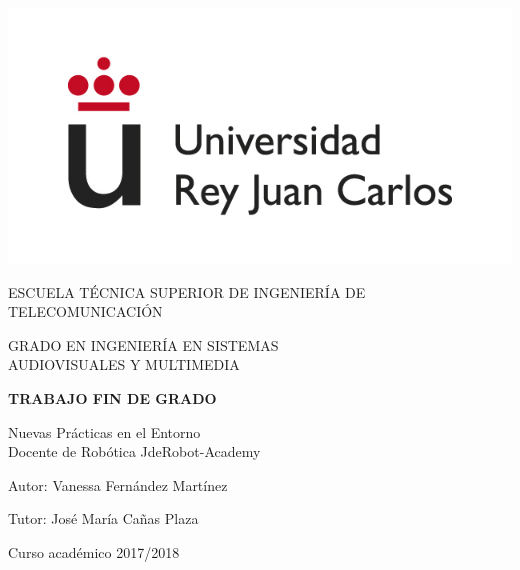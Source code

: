 \begin{titlepage}
	\begin{center}
		\vspace*{3mm}
		\begin{center}
			\includegraphics[width=0.4\linewidth]{figures/logo.jpg}
		\end{center}
		\vspace{6.5mm}
		
		\fontsize{15.5}{14}\selectfont ESCUELA TÉCNICA SUPERIOR DE INGENIERÍA DE TELECOMUNICACIÓN
		\vspace{13mm}
		
		\fontsize{14}{14}\selectfont GRADO EN INGENIERÍA EN SISTEMAS \\ AUDIOVISUALES Y MULTIMEDIA
		
		\vspace{70pt}
		
		\fontsize{15.7}{14}\selectfont \textbf{TRABAJO FIN DE GRADO} 
		
		\vspace{25mm}
		\begin{huge}
			Nuevas Prácticas en el Entorno \\ \vspace{0.4cm} Docente de Robótica JdeRobot-Academy
		\end{huge}
		
		\vspace{25mm}
		
		\begin{large}
			Autor: Vanessa Fernández Martínez
			
			Tutor: José María Cañas Plaza
			
			\vspace{10mm}
		\end{large}
		\begin{normalsize}
			Curso académico 2017/2018		
		\end{normalsize}
		\vspace{10mm}
		
	\end{center}
	
\end{titlepage}


